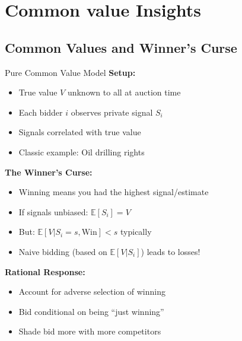 \documentclass[xcolor={x11names}]{beamer}
\newcommand{\E}{\mathbb{E}}
\begin{document}
\section{Common value Insights}

\subsection{Common Values and Winner's Curse}

\begin{frame}{Pure Common Value Model}
\textbf{Setup:}
\begin{itemize}
  \item True value $V$ unknown to all at auction time
  \item Each bidder $i$ observes private signal $S_i$
  \item Signals correlated with true value
  \item Classic example: Oil drilling rights
\end{itemize}


\textbf{The Winner's Curse:}
\begin{itemize}
  \item Winning means you had the highest signal/estimate
  \item If signals unbiased: $\E[S_i] = V$
  \item But: $\E[V | S_i = s, \text{Win}] < s$ typically
  \item Naive bidding (based on $\E[V|S_i]$) leads to losses!
\end{itemize}


\textbf{Rational Response:}
\begin{itemize}
  \item Account for adverse selection of winning
  \item Bid conditional on being ``just winning''
  \item Shade bid more with more competitors
\end{itemize}
\end{frame}
\end{document}
